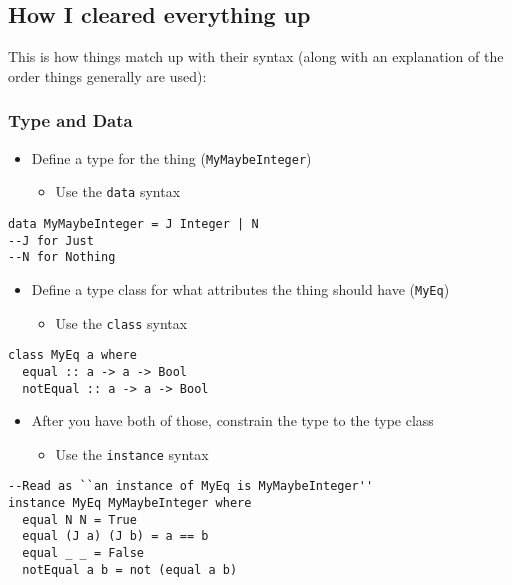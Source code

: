 \documentclass[12pt]{article}
\newcommand{\tightlist}{\setlength{\itemsep}{0pt}\setlength{\parskip}{0pt}}
\begin{document}
\subsection{How I cleared everything
up}\label{how-i-cleared-everything-up}

This is how things match up with their syntax (along with an explanation
of the order things generally are used):

\subsubsection{Type and Data}

\begin{itemize}
\tightlist
\item
  Define a type for the thing (\texttt{MyMaybeInteger})
  \begin{itemize}
    \item
      Use the \texttt{data} syntax
  \end{itemize}
\end{itemize}

\begin{lstlisting} 
data MyMaybeInteger = J Integer | N
--J for Just 
--N for Nothing 
\end{lstlisting}

\begin{itemize}
\tightlist
\item
  Define a type class for what attributes the thing should have
  (\texttt{MyEq})
  \begin{itemize}
    \item
      Use the \texttt{class} syntax
  \end{itemize}
\end{itemize}

\begin{lstlisting} 
class MyEq a where 
  equal :: a -> a -> Bool 
  notEqual :: a -> a -> Bool 
\end{lstlisting}

\begin{itemize}
\tightlist
\item
  After you have both of those, constrain the type to the type class
  \begin{itemize}
    \item
      Use the \texttt{instance} syntax
  \end{itemize}
\end{itemize}

\begin{lstlisting} 
--Read as ``an instance of MyEq is MyMaybeInteger'' 
instance MyEq MyMaybeInteger where 
  equal N N = True
  equal (J a) (J b) = a == b 
  equal _ _ = False 
  notEqual a b = not (equal a b) 
\end{lstlisting}
\end{document}
